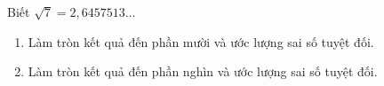\begin{bt}%
	Biết $ \sqrt{7}=2{,}6457513\ldots $
	\begin{enumerate}
		\item Làm tròn kết quả đến phần mười và ước lượng sai số tuyệt đối.
		\item Làm tròn kết quả đến phần nghìn và ước lượng sai số tuyệt đối.
	\end{enumerate}
\end{bt}


